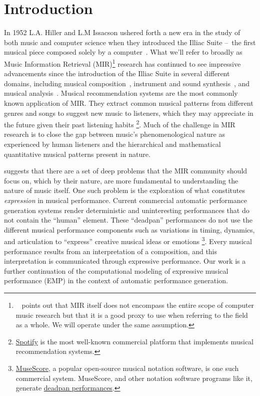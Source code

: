 \chapter{Introduction} \label{ch:ch1}

In 1952 L.A. Hiller and L.M Issacson ushered forth a new era in the study of both music and computer science when they introduced the Illiac Suite – the first musical piece composed solely by a computer~\cite{sandred2009revisiting}. What we'll refer to broadly as Music Information Retrieval (MIR)\footnote{~\citet{widmer2016getting} points out that MIR itself does not encompass the entire scope of computer music research but that it is a good proxy to use when referring to the field as a whole. We will operate under the same assumption.} research has continued to see impressive advancements since the introduction of the Illiac Suite in several different domains, including musical composition~\cite{briot2017deep}, instrument and sound synthesis~\cite{engel2017neural}, and musical analysis~\cite{widmer2016getting}. Musical recommendation systems are the most commonly known application of MIR. They extract common musical patterns from different genres and songs to suggest new music to listeners, which they may appreciate in the future given their past listening habits%
\footnote{\href{https://www.spotify.com/us/}{Spotify} is the most well-known commercial platform that implements musical recommendation systems.}. Much of the challenge in MIR research is to close the gap between music's phenomenological nature as experienced by human listeners and the hierarchical and mathematical quantitative musical patterns present in nature.

\citet{widmer2016getting} suggests that there are a set of deep problems that the MIR community should focus on, which by their nature, are more fundamental to understanding the nature of music itself. One such problem is the exploration of what constitutes \emph{expression} in musical performance. Current commercial automatic performance generation systems render deterministic and uninteresting performances that do not contain the ``human'' element. These ``deadpan'' performances do not use the different musical performance components such as variations in timing, dynamics, and articulation to ``express'' creative musical ideas or emotions%
\footnote{\href{https://musescore.org/en}{MuseScore}, a popular open-source musical notation software, is one such commercial system. MuseScore, and other notation software programs like it, generate \href{https://musescore.com/user/33884420/scores/6466906}{deadpan performances}.}. Every musical performance results from an interpretation of a composition, and this interpretation is communicated through expressive performance. Our work is a further continuation of the computational modeling of expressive musical performance (EMP) in the context of automatic performance generation. 


